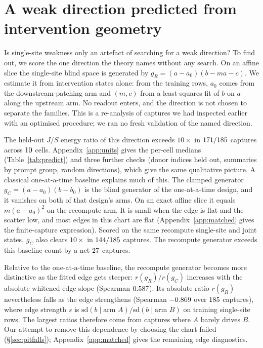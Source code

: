 \documentclass{article}
\theoremstyle{plain}
\theoremstyle{definition}
\begin{document}
\section{A weak direction predicted from intervention geometry}
\label{sec:predict}

Is single-site weakness only an artefact of searching for a weak direction? To find out, we score the one direction
the theory names without any search. On an affine slice the single-site blind space is generated by
$g_R=(a-a_0)(b-ma-c)$. We estimate it from intervention states alone: from the training rows, $a_0$ comes from
the downstream-patching arm and $(m,c)$ from a least-squares fit of $b$ on $a$ along the upstream arm. No readout
enters, and the direction is not chosen to separate the families. This is a re-analysis of captures we had inspected
earlier with an optimised procedure; we ran no fresh validation of the named direction.

The held-out $J/S$ energy ratio of this direction exceeds $10\times$ in
$171/185$ captures across $10$ cells. Appendix~\ref{app:units} gives the per-cell medians
(Table~\ref{tab:predict}) and three further checks (donor indices held out, summaries by prompt group, random directions),
which give the same qualitative picture. A classical one-at-a-time baseline explains much of this. The clamped generator
$g_C=(a-a_0)(b-b_0)$ is the blind generator of the one-at-a-time design, and it vanishes on both of that design's
arms. On an exact affine slice it equals $m(a-a_0)^2$ on the recompute arm. It is small when the edge is flat and the
scatter low, and most edges in this chart are flat (Appendix~\ref{app:matched} gives the finite-capture expression).
Scored on the same recompute single-site and joint states, $g_C$ also clears $10\times$ in $144/185$ captures.
The recompute generator exceeds this baseline count by a net $27$ captures.

Relative to the one-at-a-time baseline, the recompute generator becomes more distinctive as the fitted edge gets
steeper: $r(g_R)/r(g_C)$ increases with the absolute whitened edge slope (Spearman $0.587$). Its absolute
ratio $r(g_R)$ nevertheless falls as the edge strengthens (Spearman $-0.869$ over $185$ captures), where
edge strength $s$ is $\mathrm{sd}(b\mid\text{arm }A)/\mathrm{sd}(b\mid\text{arm }B)$ on training single-site rows.
The largest ratios therefore come from captures where $A$ barely drives $B$. Our attempt to remove this dependence by
choosing the chart failed (\S\ref{sec:pitfalls}); Appendix~\ref{app:matched} gives the remaining edge diagnostics.
\end{document}
